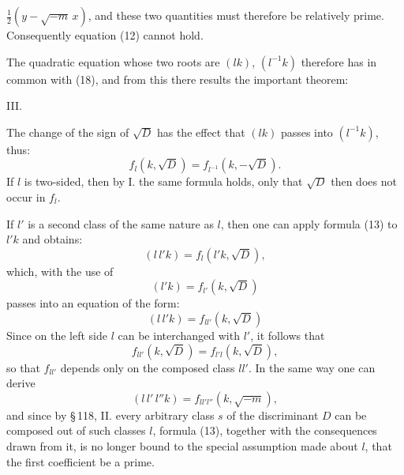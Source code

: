 $\frac{1}{2}(y - \sqrt{-m}\, x)$, and these two quantities must therefore be relatively prime. Consequently equation (12) cannot hold.

The quadratic equation whose two roots are $(lk)$, $(l^{-1}k)$ therefore has %
 in common with (18), and from this there results the important theorem:

III. 

The change of the sign of $\sqrt{D}$ has the effect that $(lk)$ passes into $(l^{-1}k)$, thus:
\[ f_l(k, \sqrt{D}) = f_{l^{-1}}(k, -\sqrt{D}). \]
If $l$ is two-sided, then by I. the same formula holds, only that $\sqrt{D}$ then does not occur in $f_l$.

If $l'$ is a second class of the same nature as $l$, then one can apply formula (13) to $l'k$ and obtains:
\[ (l\, l' k) = f_l(l' k, \sqrt{D}), \]
which, with the use of
\[ (l' k) = f_{l'}(k, \sqrt{D}) \]
passes into an equation of the form:
\[ (l\, l' k) = f_{l l'}(k, \sqrt{D}) \]
Since on the left side $l$ can be interchanged with $l'$, it follows that
\[ f_{l l'}(k, \sqrt{D}) = f_{l' l}(k, \sqrt{D}), \]
so that $f_{l l'}$ depends only on the composed class $l l'$. In the same way one can derive
\[ (l\, l'\, l'' k) = f_{l l' l''}(k, \sqrt{-m}), \] %
and since by \S\,118, II. every arbitrary class $s$ of the discriminant $D$ can be composed out of such classes $l$, formula (13), together with the consequences drawn from it, is no longer bound to the special assumption made about $l$, that the first coefficient be a prime.


